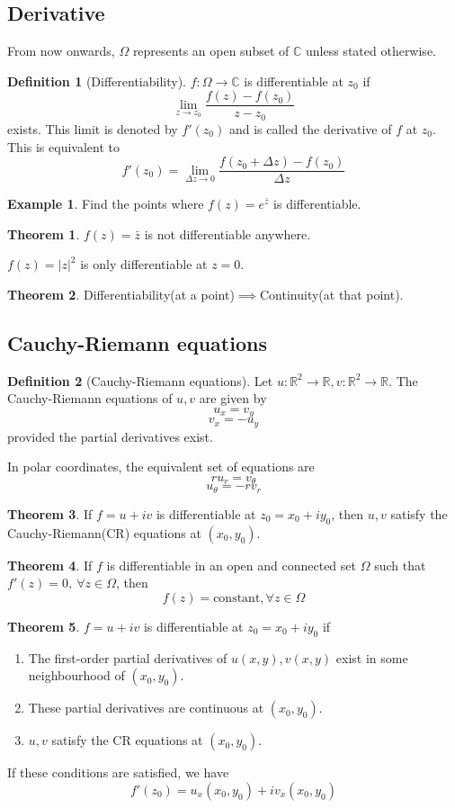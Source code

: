 \documentclass[10pt, a4paper]{extarticle}
\theoremstyle{definition}
\newtheorem{thm}{Theorem}
\newtheorem{defn}{Definition}
\newtheorem{eg}{Example}
\begin{document}
	\subsection{Derivative}
	From now onwards, $\Omega$ represents an open subset of $\mathbb{C}$ unless stated otherwise.
	\begin{defn}[Differentiability]
		$f:\Omega\to\mathbb{C}$ is differentiable at $z_0$ if
		\[\lim_{z\to z_0}\frac{f(z)-f(z_0)}{z-z_0}\]
		exists. This limit is denoted by $f'(z_0)$ and is called the derivative of $f$ at $z_0$. This is equivalent to
		\[f'(z_0)=\lim_{\Delta z\to 0}\frac{f(z_0+\Delta z)-f(z_0)}{\Delta z}\]
	\end{defn}
	\begin{eg}
		Find the points where $f(z)=e^{\bar z}$ is differentiable.
	\end{eg}
	\begin{thm}
		$f(z)=\bar{z}$ is not differentiable anywhere.

		$f(z)=|z|^2$ is only differentiable at $z=0$.
	\end{thm}
	\begin{thm}
		Differentiability(at a point)$\implies$Continuity(at that point).
	\end{thm}

	\subsection{Cauchy-Riemann equations}
	\begin{defn}[Cauchy-Riemann equations]
		Let $u:\mathbb{R}^2\to\mathbb{R},v:\mathbb{R}^2\to\mathbb{R}$. The Cauchy-Riemann equations of $u,v$ are given by
		\[u_x=v_y\]
		\[v_x=-u_y\]
		provided the partial derivatives exist.

		In polar coordinates, the equivalent set of equations are
		\[ru_r=v_\theta\]
		\[u_\theta=-rv_r\]
	\end{defn}

	\begin{thm}
		If $f=u+iv$ is differentiable at $z_0=x_0+iy_0$, then $u,v$ satisfy the Cauchy-Riemann(CR) equations at $(x_0,y_0)$.
	\end{thm}

	\begin{thm}
		If $f$ is differentiable in an open and connected set $\Omega$ such that $f'(z)=0,\ \forall z\in\Omega$, then
		\[f(z)=\text{constant}, \forall z\in\Omega\]
	\end{thm}

	\begin{thm}
		$f=u+iv$ is differentiable at $z_0=x_0+iy_0$ if
		\begin{enumerate}
			\item The first-order partial derivatives of $u(x,y),v(x,y)$ exist in some neighbourhood of $(x_0,y_0)$.
			\item These partial derivatives are continuous at $(x_0,y_0)$.
			\item $u,v$ satisfy the CR equations at $(x_0,y_0)$.
	\end{enumerate}
	If these conditions are satisfied, we have
	\[f'(z_0)=u_x(x_0,y_0)+iv_x(x_0,y_0)\]
	\end{thm}
\end{document}
